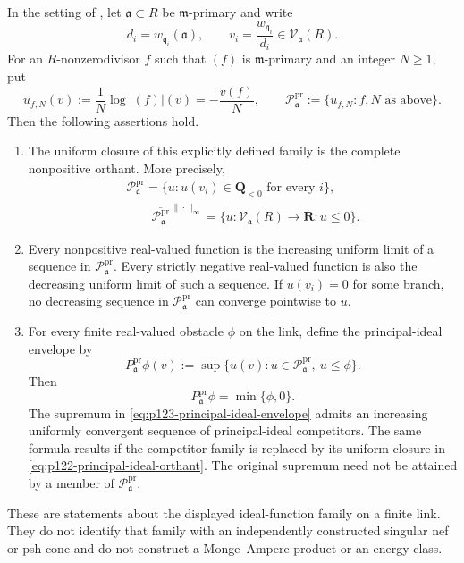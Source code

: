 \begin{theorem}
\label{thm:p122-curve-principal-ideal-envelope}
In the setting of
, let
\(\mathfrak a\subset R\) be \(\mathfrak m\)-primary and write
\[
 d_i=w_{\mathfrak q_i}(\mathfrak a),
 \qquad v_i=\frac{w_{\mathfrak q_i}}{d_i}
       \in\mathcal V_{\mathfrak a}(R).
\]
For an \(R\)-nonzerodivisor \(f\) such that \((f)\) is
\(\mathfrak m\)-primary and an integer \(N\geq1\), put
\[
 u_{f,N}(v):=\frac1N\log|(f)|(v)=-\frac{v(f)}N,
 \qquad
 \mathscr P_{\mathfrak a}^{\mathrm{pr}}
 :=\{u_{f,N}:f,N\text{ as above}\}.
 \tag{\(\diamondsuit\)}\label{eq:p122-principal-ideal-profile-family}
\]
Then the following assertions hold.
\begin{enumerate}
\item The uniform closure of this explicitly defined family is the complete
      nonpositive orthant.  More precisely,
      \[
       \begin{gathered}
       \mathscr P_{\mathfrak a}^{\mathrm{pr}}
       =\{u:u(v_i)\in\mathbf Q_{<0}\text{ for every }i\},\\
       \qquad
       \overline{\mathscr P_{\mathfrak a}^{\mathrm{pr}}}^{\,\|\cdot\|_\infty}
       =\{u:\mathcal V_{\mathfrak a}(R)\to\mathbf R:u\leq0\}.
       \end{gathered}
       \tag{\(\heartsuit\)}\label{eq:p122-principal-ideal-orthant}
      \]
\item Every nonpositive real-valued function is the increasing uniform limit
      of a sequence in \(\mathscr P_{\mathfrak a}^{\mathrm{pr}}\).  Every
      strictly negative real-valued function is also the decreasing uniform
      limit of such a sequence.  If \(u(v_i)=0\) for some branch, no
      decreasing sequence in \(\mathscr P_{\mathfrak a}^{\mathrm{pr}}\)
      can converge pointwise to \(u\).
\item For every finite real-valued obstacle \(\phi\) on the link, define the
      principal-ideal envelope by
      \[
       P_{\mathfrak a}^{\mathrm{pr}}\phi(v)
       :=\sup\{u(v):u\in\mathscr P_{\mathfrak a}^{\mathrm{pr}},\ u\leq\phi\}.
       \tag{\(\star\)}\label{eq:p123-principal-ideal-envelope}
      \]
      Then
      \[
                         P_{\mathfrak a}^{\mathrm{pr}}\phi
                              =\min\{\phi,0\}.
       \tag{\(\dagger\)}\label{eq:p123-principal-ideal-envelope-formula}
      \]
      The supremum in \eqref{eq:p123-principal-ideal-envelope} admits an
      increasing uniformly convergent sequence of principal-ideal
      competitors.  The same formula results if the competitor family is
      replaced by its uniform closure in
      \eqref{eq:p122-principal-ideal-orthant}.  The original supremum need
      not be attained by a member of
      \(\mathscr P_{\mathfrak a}^{\mathrm{pr}}\).
\end{enumerate}
These are statements about the displayed ideal-function family on a finite
link.  They do not identify that family with an independently constructed
singular nef or psh cone and do not construct a Monge--Ampere product or an
energy class.
\end{theorem}

